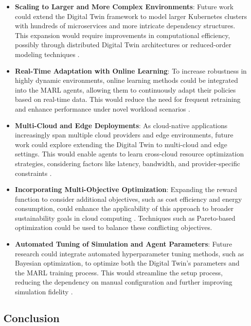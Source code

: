 \documentclass[conference]{IEEEtran}
\begin{document}
\begin{itemize}
    \item \textbf{Scaling to Larger and More Complex Environments}: Future work could extend the Digital Twin framework to model larger Kubernetes clusters with hundreds of microservices and more intricate dependency structures. This expansion would require improvements in computational efficiency, possibly through distributed Digital Twin architectures or reduced-order modeling techniques \cite{schleich_digital_twin}.
    
    \item \textbf{Real-Time Adaptation with Online Learning}: To increase robustness in highly dynamic environments, online learning methods could be integrated into the MARL agents, allowing them to continuously adapt their policies based on real-time data. This would reduce the need for frequent retraining and enhance performance under novel workload scenarios \cite{schwartz_drl_cloud}.
    
    \item \textbf{Multi-Cloud and Edge Deployments}: As cloud-native applications increasingly span multiple cloud providers and edge environments, future work could explore extending the Digital Twin to multi-cloud and edge settings. This would enable agents to learn cross-cloud resource optimization strategies, considering factors like latency, bandwidth, and provider-specific constraints \cite{liu_dt_cloud}.
    
    \item \textbf{Incorporating Multi-Objective Optimization}: Expanding the reward function to consider additional objectives, such as cost efficiency and energy consumption, could enhance the applicability of this approach to broader sustainability goals in cloud computing \cite{wu_multi_objective_rl}. Techniques such as Pareto-based optimization could be used to balance these conflicting objectives.
    
    \item \textbf{Automated Tuning of Simulation and Agent Parameters}: Future research could integrate automated hyperparameter tuning methods, such as Bayesian optimization, to optimize both the Digital Twin's parameters and the MARL training process. This would streamline the setup process, reducing the dependency on manual configuration and further improving simulation fidelity \cite{schulman_ppo}.
\end{itemize}

\subsection{Conclusion}
\end{document}
